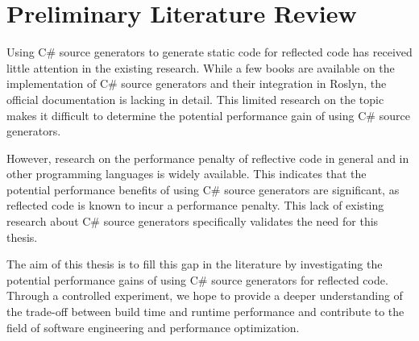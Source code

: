 \chapter{Preliminary Literature Review}

Using C\# source generators to generate static code for reflected code has received little attention in the existing research. While a few books are available on the implementation of C\# source generators and their integration in Roslyn, the official documentation is lacking in detail. This limited research on the topic makes it difficult to determine the potential performance gain of using C\# source generators.

However, research on the performance penalty of reflective code in general and in other programming languages is widely available. This indicates that the potential performance benefits of using C\# source generators are significant, as reflected code is known to incur a performance penalty. This lack of existing research about C\# source generators specifically validates the need for this thesis.

The aim of this thesis is to fill this gap in the literature by investigating the potential performance gains of using C\# source generators for reflected code. Through a controlled experiment, we hope to provide a deeper understanding of the trade-off between build time and runtime performance and contribute to the field of software engineering and performance optimization.